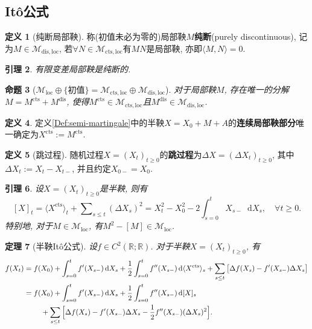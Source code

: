 \documentclass{ctexart}
\theoremstyle{definition}
\newtheorem{Def}{定义}[section]
\theoremstyle{remark}
\theoremstyle{plain}
\newtheorem{Prop}[Def]{命题}
\newtheorem{Lem}[Def]{引理}
\newtheorem{Thm}[Def]{定理}
\newcommand{\1}{\mathbbm{1}}				%
\newcommand{\agp}[1]{\langle #1 \rangle}	%
\newcommand{\R}{\mathbb{R}}					%
\newcommand{\tsum}{\textstyle\sum\nolimits}
\renewcommand*{\d}{\mathop{}\!\mathrm{d}}	%
\begin{document}
\subsection*{It\^{o}公式}
\begin{Def}[纯断局部鞅]
称(初值未必为零的)局部鞅$M$\textbf{纯断}(purely discontinuous), 记为$M \in \mathcal{M}_{\mathrm{dis},\mathrm{loc}}$, 若$\forall N \in \mathcal{M}_{\mathrm{cts},\mathrm{loc}}$有$MN$是局部鞅, 亦即$\agp{M,N} = 0$.
\end{Def}

\begin{Lem}
有限变差局部鞅是纯断的.
\end{Lem}

\begin{Prop}[$\mathcal{M}_{\mathrm{loc}}\oplus\{\text{初值}\}=\mathcal{M}_{\mathrm{cts},\mathrm{loc}}\oplus\mathcal{M}_{\mathrm{dis},\mathrm{loc}}$]
对于局部鞅$M$, 存在唯一的分解$M = M^{\mathrm{cts}}+M^{\mathrm{dis}}$, 使得$M^{\mathrm{cts}}\in\mathcal{M}_{\mathrm{cts},\mathrm{loc}}$且$M^{\mathrm{dis}}\in\mathcal{M}_{\mathrm{dis},\mathrm{loc}}$.
\end{Prop}

\begin{Def}
定义\ref{Def:semi-martingale}中的半鞅$X = X_{0} + M + A$的\textbf{连续局部鞅部分}唯一确定为$X^{\mathrm{cts}} := M^{\mathrm{cts}}$.
\end{Def}

\begin{Def}[跳过程]
随机过程$X = (X_{t})_{t \ge 0}$的\textbf{跳过程}为$\Delta X = (\Delta X_{t})_{t \ge 0}$, 其中$\Delta X_{t} := X_{t}-X_{t-}$, 并且约定$X_{0-} = X_{0}$.
\end{Def}

\begin{Lem}
设$X = (X_{t})_{t \ge 0}$是半鞅, 则有
\[ [X]_{t} = \agp{X^{\mathrm{cts}}}_{t} + \tsum_{s\le t} (\Delta X_{s})^{2} = X_{t}^{2}-X_{0}^{2} - 2 \int_{s=0}^{t} X_{s-} \d X_{s} ,\quad \forall t \ge 0 . \]
特别地, 对于$M \in \mathcal{M}_{\mathrm{loc}}$, 有$M^{2}-[M] \in \mathcal{M}_{\mathrm{loc}}$.
\end{Lem}

\begin{Thm}[半鞅It\^{o}公式]
设$f \in C^{2}(\R;\R)$. 对于半鞅$X = (X_{t})_{t \ge 0}$, 有
\[\begin{aligned}
f(X_{t}) &= f(X_{0}) + \int_{s=0}^{t} f'(X_{s-}) \d X_{s} + \frac{1}{2}\int_{s=0}^{t} f''(X_{s-}) \d\agp{X^{\mathrm{cts}}}_{s} + \sum_{s\le t} \big[ \Delta f(X_{s}) - f'(X_{s-}) \Delta X_{s} \big] \\
&= f(X_{0}) + \int_{s=0}^{t} f'(X_{s-}) \d X_{s} + \frac{1}{2}\int_{s=0}^{t} f''(X_{s-}) \d[X]_{s} \\
&\hspace{2.333em} + \sum_{s\le t} \Big[ \Delta f(X_{s}) - f'(X_{s-}) \Delta X_{s} - \frac{1}{2} f''(X_{s-}) (\Delta X_{s})^{2} \Big] . 
\end{aligned}\]
\end{Thm}
\end{document}
